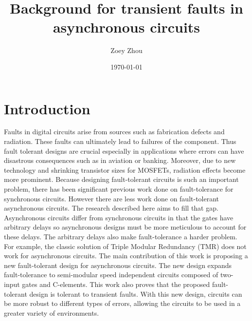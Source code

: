 \documentclass[12pt]{report}
\title{Background for transient faults in asynchronous circuits}
\author{Zoey Zhou}
\date{\today}
\begin{document}
\chapter{Introduction}

Faults in digital circuits arise from sources such as fabrication defects and radiation.  These faults can ultimately lead to failures of the component.  Thus fault tolerant designs are crucial especially in applications where errors can have disastrous consequences such as in aviation or banking.  Moreover, due to new technology and shrinking transistor sizes for MOSFETs, radiation effects become more prominent.  Because designing fault-tolerant circuits is such an important problem, there has been significant previous work done on fault-tolerance for synchronous circuits.  However there are less work done on fault-tolerant asynchronous circuits.  The research described here aims to fill that gap.\\

Asynchronous circuits differ from synchronous circuits in that the gates have arbitrary delays so asynchronous designs must be more meticulous to account for these delays.  The arbitrary delays also make fault-tolerance a harder problem.  For example, the classic solution of Triple Modular Redundancy (TMR) does not work for asynchronous circuits.  The main contribution of this work is proposing a new fault-tolerant design for asynchronous circuits.  The new design expands fault-tolerance to semi-modular speed independent circuits composed of two-input gates and C-elements.  This work also proves that the proposed fault-tolerant design is tolerant to transient faults.  With this new design, circuits can be more robust to different types of errors, allowing the circuits to be used in a greater variety of environments.



\end{document}
